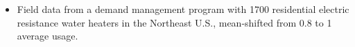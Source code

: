 \begin{itemize}
\item Field data from a demand management program with 1700 residential electric resistance water heaters in the Northeast U.S., mean-shifted from 0.8 to 1 average usage.
\end{itemize}
